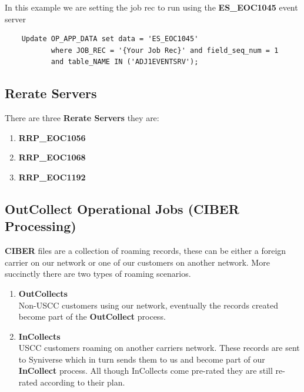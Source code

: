 \documentclass[12pt,twoside]{article}
\begin{document}
   In this example we are setting the job rec to run using the \textbf{ES\_EOC1045} event server 

\begin{verbatim}
    Update OP_APP_DATA set data = 'ES_EOC1045'
           where JOB_REC = '{Your Job Rec}' and field_seq_num = 1 
           and table_NAME IN ('ADJ1EVENTSRV');
\end{verbatim}
\subsection{Rerate Servers}
\label{sec-3-5}

   There are three \textbf{Rerate Servers} they are:
\begin{enumerate}
\item \textbf{RRP\_EOC1056}
\item \textbf{RRP\_EOC1068}
\item \textbf{RRP\_EOC1192}
\end{enumerate}
\subsection{OutCollect Operational Jobs (CIBER Processing)}
\label{sec-3-6}

  \textbf{CIBER} files are a collection of roaming records, these can be
  either a foreign carrier on our network or one of our customers
  on another network. More succinctly there are two
  types of roaming scenarios.
\begin{enumerate}
\item \textbf{OutCollects}\\ Non-USCC customers using our network, eventually
       the records created become part of the \textbf{OutCollect} process.
\item \textbf{InCollects}\\ USCC customers roaming on another carriers
       network. These records are sent to Syniverse which in turn
       sends them to us and become part of our \textbf{InCollect} process. All though InCollects come pre-rated they are still re-rated according to their plan.
\end{enumerate}
\end{document}
